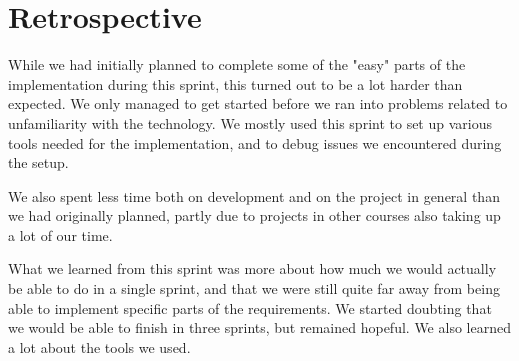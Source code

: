 \section{Retrospective}
While we had initially planned to complete some of the "easy" parts of the implementation during this sprint, this turned out to be a lot harder than expected. We only managed to get started before we ran into problems related to unfamiliarity with the technology. We mostly used this sprint to set up various tools needed for the implementation, and to debug issues we encountered during the setup.

We also spent less time both on development and on the project in general than we had originally planned, partly due to projects in other courses also taking up a lot of our time.

What we learned from this sprint was more about how much we would actually be able to do in a single sprint, and that we were still quite far away from being able to implement specific parts of the requirements. We started doubting that we would be able to finish in three sprints, but remained hopeful. We also learned a lot about the tools we used.
